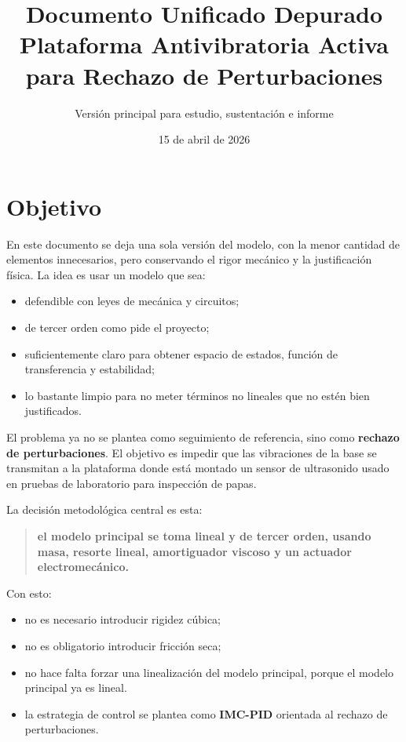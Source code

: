 \documentclass[11pt]{article}
\title{Documento Unificado Depurado\\Plataforma Antivibratoria Activa para Rechazo de Perturbaciones}
\author{Versi\'on principal para estudio, sustentaci\'on e informe}
\date{15 de abril de 2026}
\begin{document}
\maketitle
\tableofcontents
\newpage

\section{Objetivo}

En este documento se deja una sola versi\'on del modelo, con la menor cantidad de elementos innecesarios, pero conservando el rigor mec\'anico y la justificaci\'on f\'isica. La idea es usar un modelo que sea:

\begin{itemize}[leftmargin=1.2cm]
\item defendible con leyes de mec\'anica y circuitos;
\item de tercer orden como pide el proyecto;
\item suficientemente claro para obtener espacio de estados, funci\'on de transferencia y estabilidad;
\item lo bastante limpio para no meter t\'erminos no lineales que no est\'en bien justificados.
\end{itemize}

El problema ya no se plantea como seguimiento de referencia, sino como \textbf{rechazo de perturbaciones}. El objetivo es impedir que las vibraciones de la base se transmitan a la plataforma donde est\'a montado un sensor de ultrasonido usado en pruebas de laboratorio para inspecci\'on de papas.

La decisi\'on metodol\'ogica central es esta:

\begin{quote}
\textbf{el modelo principal se toma lineal y de tercer orden, usando masa, resorte lineal, amortiguador viscoso y un actuador electromec\'anico.}
\end{quote}

Con esto:

\begin{itemize}[leftmargin=1.2cm]
\item no es necesario introducir rigidez c\'ubica;
\item no es obligatorio introducir fricci\'on seca;
\item no hace falta forzar una linealizaci\'on del modelo principal, porque el modelo principal ya es lineal.
\item la estrategia de control se plantea como \textbf{IMC-PID} orientada al rechazo de perturbaciones.
\end{itemize}
\end{document}
